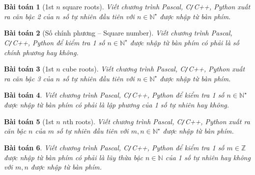 \documentclass{article}
\newtheorem{baitoan}{Bài toán}
\begin{document}
\begin{baitoan}[1st $n$ square roots]
	Viết chương trình {\sf Pascal, C{\tt /}C++, Python} xuất ra căn bậc 2 của $n$ số tự nhiên đầu tiên với $n\in\mathbb{N}^\star$ được nhập từ bàn phím.
\end{baitoan}

\begin{baitoan}[Số chính phương -- Square number]
	Viết chương trình {\sf Pascal, C{\tt /}C++, Python} để kiểm tra 1 số $n\in\mathbb{N}^\star$ được nhập từ bàn phím có phải là số chính phương hay không.
\end{baitoan}

\begin{baitoan}[1st $n$ cube roots]
	Viết chương trình {\sf Pascal, C{\tt /}C++, Python} xuất ra căn bậc 3 của $n$ số tự nhiên đầu tiên với $n\in\mathbb{N}^\star$ được nhập từ bàn phím.
\end{baitoan}

\begin{baitoan}
	Viết chương trình {\sf Pascal, C{\tt /}C++, Python} để kiểm tra 1 số $n\in\mathbb{N}^\star$ được nhập từ bàn phím có phải là lập phương của 1 số tự nhiên hay không.
\end{baitoan}

\begin{baitoan}[1st $n$ $n$th roots]
	Viết chương trình {\sf Pascal, C{\tt /}C++, Python} xuất ra căn bậc $n$ của $m$ số tự nhiên đầu tiên với $m,n\in\mathbb{N}^\star$ được nhập từ bàn phím.
\end{baitoan}

\begin{baitoan}
	Viết chương trình {\sf Pascal, C{\tt /}C++, Python} để kiểm tra 1 số $m\in\mathbb{Z}$ được nhập từ bàn phím có phải là lũy thừa bậc $n\in\mathbb{N}$ của 1 số tự nhiên hay không với $m,n$ được nhập từ bàn phím.
\end{baitoan}
\end{document}
